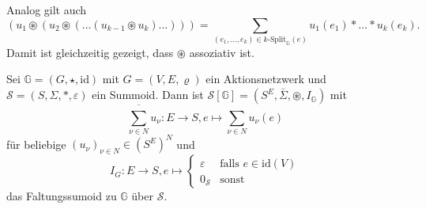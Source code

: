 \documentclass{article}
\begin{document}
\begin{remark}
  Analog gilt auch
  \begin{equation*}
    (u_1 \circledast (u_2 \circledast (\dots (u_{k - 1} \circledast u_k) \dots ))) = \sum_{(e_1, \dots, e_k) \in k\text{-Split}_\mathbb{G}(e)}u_1(e_1) \ast \dots \ast u_k(e_k).
  \end{equation*}
  Damit ist gleichzeitig gezeigt, dass $\circledast$ assoziativ ist.
\end{remark}

\begin{definition}
  Sei $\mathbb{G} = (G, \star, \text{id})$ mit $G = (V, E, \varrho)$ ein Aktionsnetzwerk
  und $\mathcal{S} = (S, \Sigma, \ast, \varepsilon)$ ein Summoid.
  Dann ist $\mathcal{S}[\mathbb{G}] = (S^E, \bar\Sigma, \circledast, I_\mathbb{G})$ mit
  \begin{equation*}
    \overline{\sum_{\nu \in N}} u_\nu \colon E \to S, e \mapsto \sum_{\nu \in N}u_\nu(e)
  \end{equation*}
  für beliebige $(u_\nu)_{\nu \in N} \in (S^E)^N$
  und
  \begin{equation*}
    I_G \colon E \to S, e \mapsto
    \begin{cases}
      \varepsilon & \text{falls } e \in \text{id}(V) \\
      0_\mathcal{S} & \text{sonst}
    \end{cases}
  \end{equation*} 
  das Faltungssumoid zu $\mathbb{G}$ über $\mathcal{S}$.
\end{definition}
\end{document}
